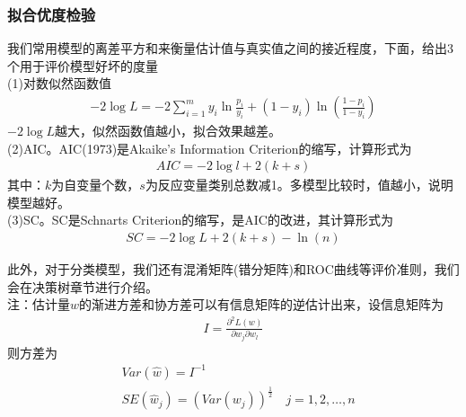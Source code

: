         \subsubsection{拟合优度检验}
            \par
            我们常用模型的离差平方和来衡量估计值与真实值之间的接近程度，下面，给出3个用于评价模型好坏的度量\\
            (1)对数似然函数值
            \begin{align*}
            -2\log L = -2 \sum_{i=1}^m y_i\ln \frac{p_i}{y_i}+ (1-y_i)\ln \left( \frac{1-p_i}{1-y_i} \right)
            \end{align*}
            $-2\log L $越大，似然函数值越小，拟合效果越差。\\
            (2)AIC。AIC(1973)是Akaike's Information Criterion的缩写，计算形式为
            \begin{align*}
            AIC = -2\log l + 2(k+s)
            \end{align*}
            其中：$k$为自变量个数，$s$为反应变量类别总数减1。多模型比较时，值越小，说明模型越好。\\
            (3)SC。SC是Schnarts Criterion的缩写，是AIC的改进，其计算形式为
            \begin{align*}
            SC = -2\log L + 2(k+s)-\ln (n)
            \end{align*}
            \par
            此外，对于分类模型，我们还有混淆矩阵(错分矩阵)和ROC曲线等评价准则，我们会在决策树章节进行介绍。\\
            注：估计量$w$的渐进方差和协方差可以有信息矩阵的逆估计出来，设信息矩阵为
            \begin{align*}
            I = \frac{\partial^2L(w)}{\partial w_j\partial w_l}
            \end{align*}
            则方差为
            \begin{align*}
            & Var(\hat{w}) = I^{-1} \\
            & SE(\hat{w}_j) = (Var(w_j))^{\frac{1}{2}} \quad j = 1,2,\dots,n
            \end{align*}

